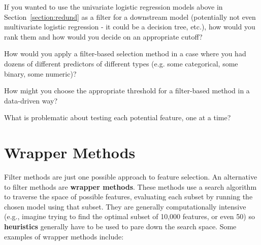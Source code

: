 \begin{question}{}
If you wanted to use the univariate logistic regression models above in Section~\ref{section:redund} as a filter for a downstream model (potentially not even multivariate logistic regression - it could be a decision tree, etc.), how would you rank them and how would you decide on an appropriate cutoff? 
\end{question}

\begin{question}{}
How would you apply a filter-based selection method in a case where you had dozens of different predictors of different types (e.g. some categorical, some binary, some numeric)? 
\end{question}

\begin{question}{}
How might you choose the appropriate threshold for a filter-based method in a data-driven way? 
\end{question}

\begin{question}{}
What is problematic about testing each potential feature, one at a time?
\end{question}


\section{Wrapper Methods}

Filter methods are just one possible approach to feature selection. An alternative to filter methods are \textbf{wrapper methods}. These methods use a search algorithm to traverse the space of possible features, evaluating each subset by running the chosen model using that subset. They are generally computationally intensive (e.g., imagine trying to find the optimal subset of 10,000 features, or even 50) so \textbf{heuristics} generally have to be used to pare down the search space. Some examples of wrapper methods include:


